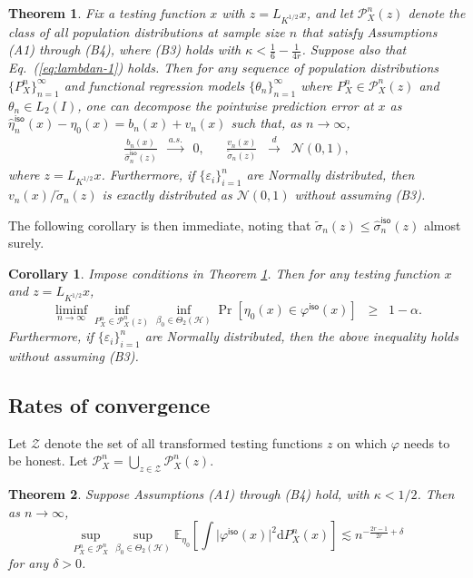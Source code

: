 \documentclass[11pt,a4paper]{article}
\renewcommand{\hat}{\widehat}
\renewcommand{\tilde}{\widetilde}
\theoremstyle{definition}
\theoremstyle{plain}
\newtheorem{theorem}{Theorem}[section]
\newtheorem{corollary}{Corollary}[section]
\theoremstyle{remark}
\newcommand{\ud}{\mathrm d}
\newcommand{\mH}{\mathcal H}
\newcommand{\iso}{\mathsf{iso}}
\begin{document}
\begin{theorem}
Fix a testing function $x$ with $z=L_{K^{1/2}}x$, and let $\mathcal P_X^n(z)$ denote the class of all population distributions at sample size $n$ that satisfy 
Assumptions (A1) through (B4), where (B3) holds with $\kappa<\frac{1}{6}-\frac{1}{4r}$. Suppose also that Eq.~(\ref{eq:lambdan-1}) holds. Then 
for any sequence of population distributions $\{P_X^n\}_{n=1}^{\infty}$ and functional regression models $\{\theta_n\}_{n=1}^{\infty}$ where $P_X^n\in\mathcal P_X^n(z)$ and $\theta_n\in L_2(I)$, one can decompose the pointwise prediction error at $x$ as $\hat\eta_n^\iso(x)-\eta_0(x)=b_n(x)+v_n(x)$ such that, as $n\to\infty$, 
\begin{align*}
\frac{b_n(x)}{\hat\sigma_n^\iso(z)}\;\;\overset{a.s.}{\to}\;\; 0,\;\;\;\;\;\;\frac{v_n(x)}{\tilde\sigma_n(z)}\;\;\overset{d}{\to}\;\;\mathcal N(0,1),
\end{align*}
where $z=L_{K^{1/2}}x$.
Furthermore, if $\{\varepsilon_i\}_{i=1}^n$ are Normally distributed, then $v_n(x)/\tilde\sigma_n(z)$ is exactly distributed as $\mathcal N(0,1)$ without assuming (B3).
\label{thm:isokrr-limiting}
\end{theorem}

The following corollary is then immediate, noting that $\tilde\sigma_n(z)\leq\hat\sigma_n^\iso(z)$ almost surely.
\begin{corollary}
Impose conditions in Theorem \ref{thm:isokrr-limiting}. Then for any testing function $x$
and $z=L_{K^{1/2}}x$,
$$
\liminf_{n\to\infty}\inf_{P_X^n\in\mathcal P_X^n(z)}\inf_{\beta_0\in\Theta_2(\mH)}\Pr[\eta_0(x)\in\varphi^\iso(x)]\;\;\geq\;\; 1-\alpha.
$$
Furthermore, if $\{\varepsilon_i\}_{i=1}^n$ are Normally distributed, then the above inequality holds without assuming (B3).
\label{cor:isokrr-ci}
\end{corollary}

\subsection{Rates of convergence}

Let $\mathcal Z$ denote the set of all transformed
testing functions $z$ on which $\varphi$ needs
to be honest. Let $\mathcal P_X^n = \bigcup_{z\in\mathcal Z}\mathcal P_X^n(z)$.

\begin{theorem}
Suppose Assumptions (A1) through (B4) hold, with $\kappa<1/2$. Then as $n\to\infty$, 
\begin{equation}
\sup_{P_X^n\in\mathcal P_X^n}\sup_{\beta_0\in\Theta_2(\mH)}\mathbb E_{\eta_0}\left[\int\big|\varphi^\iso(x)\big|^2\ud P_X^n(x)\right]\lesssim n^{-\frac{2r-1}{2r}+\delta}
\label{eq:simple-validity}
\end{equation}
for any $\delta>0$.
\label{thm:isokrr-rates}
\end{theorem}
\end{document}
